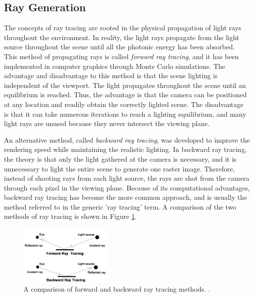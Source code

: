 \documentclass[letterpaper, 11pt, onecolumn, oneside]{article}
\begin{document}
    \subsection{Ray Generation}
    \label{section:ray-generation}
        The concepts of ray tracing are rooted in the physical propagation of light rays throughout the environment.
        In reality, the light rays propagate from the light source throughout the scene until all the photonic energy has been absorbed.
        This method of propagating rays is called \textit{forward ray tracing}, and it has been implemented in computer graphics through Monte Carlo simulations.
        The advantage and disadvantage to this method is that the scene lighting is independent of the viewport.
        The light propagates throughout the scene until an equilibrium is reached.
        Thus, the advantage is that the camera can be positioned at any location and readily obtain the correctly lighted scene.
        The disadvantage is that it can take numerous iterations to reach a lighting equilibrium, and many light rays are unused because they never intersect the viewing plane.

        An alternative method, called \textit{backward ray tracing}, was developed to improve the rendering speed while maintaining the realistic lighting.
        In backward ray tracing, the theory is that only the light gathered at the camera is necessary, and it is unnecessary to light the entire scene to generate one raster image.
        Therefore, instead of shooting rays from each light source, the rays are shot from the camera through each pixel in the viewing plane.
        Because of its computational advantages, backward ray tracing has become the more common approach, and is usually the method referred to in the generic 'ray tracing' term.
        A comparison of the two methods of ray tracing is shown in Figure \ref{fig:forward-backward-tracing}.

        \begin{figure}
            \includegraphics[width=0.4\textwidth]{forward-backward-tracing.jpg}
            \centering
            \caption{A comparison of forward and backward ray tracing methods. \cite{educba2019}.}
            \label{fig:forward-backward-tracing}
        \end{figure}
\end{document}

